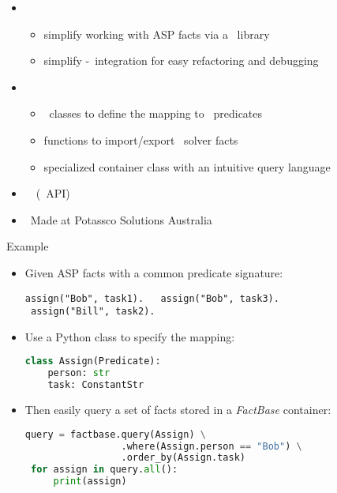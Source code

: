 \begin{frame}{\clorm}
  \begin{itemize}
  \item {} \
    \begin{itemize}
    \item simplify working with ASP facts via a \python\ library
    \item simplify \python-\clingo\ integration for easy refactoring and debugging
      \end{itemize}
  \item {} \
    \begin{itemize}
    \item \python\ classes to define the mapping to \clingo\ predicates
    \item functions to import/export \clingo\ solver facts
    \item specialized container class with an intuitive query language
    \end{itemize}
  \item \structure{Technology}   \ \clingo\ (\python\ API)
  \item \structure{Origin} \ Made at Potassco Solutions Australia
  \end{itemize}
\end{frame}
\begin{frame}[fragile]{Example}

  \begin{itemize}
  \item Given ASP facts with a common predicate signature:

\begin{lstlisting}[language=clingo,basicstyle=\small\ttfamily]
 assign("Bob", task1).   assign("Bob", task3).
 assign("Bill", task2).
\end{lstlisting}

  \item Use a Python class to specify the mapping:

\begin{lstlisting}[language=Python, basicstyle=\small\ttfamily]
 class Assign(Predicate):
    person: str
    task: ConstantStr
\end{lstlisting}

  \item Then easily query a set of facts stored in a \emph{FactBase} container:

\begin{lstlisting}[language=Python, basicstyle=\small\ttfamily]
 query = factbase.query(Assign) \
                 .where(Assign.person == "Bob") \
                 .order_by(Assign.task)
 for assign in query.all():
     print(assign)
\end{lstlisting}
  \end{itemize}
\end{frame}
%
